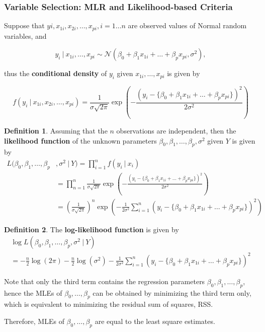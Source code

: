 \documentclass[11pt]{article}
\theoremstyle{definition}
\newtheorem{definition}{Definition}[section]
\numberwithin{equation}{section}
\begin{document}
\subsubsection{Variable Selection: MLR and Likelihood-based Criteria}

Suppose that $yi, x_{1i}, x_{2i}, \dots, x_{pi}, i=1\dots n$ are observed values of Normal random variables, and

\begin{equation}
  y_i\>|\> x_{1i},\dots,x_{pi}\sim \mathcal{N}(\beta_0+ \beta_1x_{1i}+\dots+\beta_px_{pi}, \sigma^2),
\end{equation}

thus the \textbf{conditional density} of $y_i$ given $x_{1i},\dots,x_{pi}$ is given by

\begin{equation}
  f(y_i\>|\>x_{1i},x_{2i},\dots,x_{pi}) = \frac{1}{\sigma\sqrt{2\pi}}\exp\left( -\frac{(y_i - \{\beta_0+\beta_1x_{1i} + \dots + \beta_px_{pi}\})^2}{2\sigma^2} \right)
\end{equation}

\begin{definition}
  Assuming that the $n$ observations are independent, then the \textbf{likelihood function} of the unknown parameters $\beta_0,\beta_1,\dots,\beta_p,\sigma^2$ given $Y$ is given by
  \begin{align}
    L(\beta_0,\beta_1,\dots,\beta_p&,\sigma^2\>|\> Y)=\prod^n_{i=1} f(y_i\>|\> x_i)\\
    &=\prod^n_{n=1}\frac{1}{\sigma\sqrt{2\pi}}\exp\left( -\frac{(y_i - \{\beta_0+\beta_1x_{1i} + \dots + \beta_px_{pi}\})^2}{2\sigma^2}\right)\\
    &=\left(\frac{1}{\sigma\sqrt{2\pi}}\right)^n\exp\left( -\frac{1}{2\sigma^2}\sum^n_{i=1}(y_i - \{\beta_0+\beta_1x_{1i} + \dots + \beta_px_{pi}\})^2 \right)
  \end{align}
\end{definition}

\begin{definition}
  The \textbf{log-likelihood function} is given by
  \begin{gather}
    \log L(\beta_0,\beta_1,\dots,\beta_p,\sigma^2\>|\> Y)\\
    = -\frac{n}{2}\log(2\pi) - \frac{n}{2}\log(\sigma^2) - \frac{1}{2\sigma^2}\sum^n_{i = 1}(y_i - \{ \beta_0 + \beta_1x_{1i} + \dots + \beta_px_{pi}\})^2
  \end{gather}
\end{definition}
\begin{writenotes}
  Note that only the third term contains the regression parameters $\beta_0,\beta_1,\dots,\beta_p$, hence the MLEs of $\beta_0,\dots,\beta_p$ can be obtained by minimizing the third term only, which is equivalent to minimizing the residual sum of squares, RSS.

  Therefore, MLEs of $\beta_0,\dots,\beta_p$ are equal to the least square estimates.
\end{writenotes}
\end{document}
